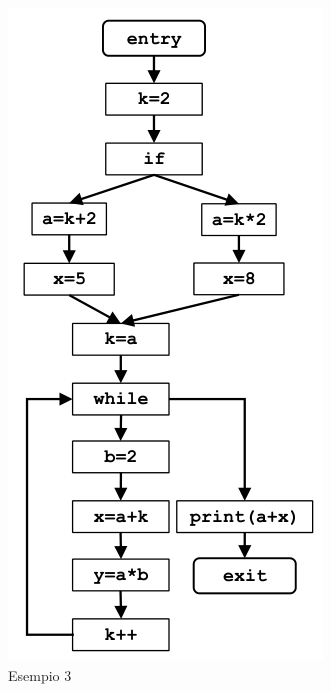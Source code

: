 \documentclass[10pt,a4paper]{article}
\begin{document}
\begin{figure}[h]
  \centering
  \includegraphics[width=.5\textwidth]{example-3.png}
  \caption{Esempio 3}
\end{figure}
\end{document}
